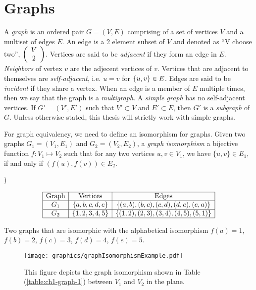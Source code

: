 \section{Graphs}
A \textit{graph} is an ordered pair $G = (V,E)$ comprising of a set of vertices $V$ and a multiset of edges $E$.  
An edge is a 2 element subset of $V$ and denoted as ``V choose two'', $\left(\begin{array}{c}V\\2\end{array}\right)$.
Vertices are said to be \textit{adjacent} if they form an edge in $E$.  
\textit{Neighbors} of vertex $v$ are the adjecent vertices of $v$.
Vertices that are adjacent to themselves are \textit{self-adjacent}, i.e. $u = v$ for $\left\lbrace u,v \right\rbrace \in E$.  
Edges are said to be \textit{incident} if they share a vertex.  
When an edge is a member of $E$ multiple times, then we say that the graph is a \textit{multigraph}.   
A \textit{simple graph} has no self-adjacent vertices. 
If $G' = (V',E')$ such that $V' \subset V$ and $E' \subset E$, then $G'$ is a \textit{subgraph} of $G$.
Unless otherwise stated, this thesis will 
strictly work with simple graphs.

For graph equivalency, we need to define an isomorphism for graphs.  Given 
two graphs $G_1 =(V_1,E_1)$ and $G_2 = (V_2,E_2) $, a \textit{graph isomorphism} a bijective 
function $f: V_1 \mapsto 
V_2$ 
such that for any two vertices $u,v \in V_1$, we have $\{u, v\} \in E_1$, if and 
only 
if $(f(u),f(v)) \in E_2$. 
\begin{table}[!ht]\label{table:ch1-graph-1})
\begin{center}
$$\begin{array}{|c|c|c|}\hline
\text{Graph}&\text{Vertices}&\text{Edges}\\\hline
G_1&\left\lbrace a,b,c,d,e \right\rbrace & \left\lbrace (a,b),(b,c),(c,d),(d,e),(e,a) \right\rbrace 
\\\hline
G_2&\left\lbrace 1,2,3,4,5 \right\rbrace & \left\lbrace (1,2),(2,3),(3,4),(4,5),(5,1) \right\rbrace 
\\\hline
\end{array} $$
\caption{Two graphs that are isomorphic with the alphabetical isomorphism $f(a)=1$, $f(b)=2$, $f(c) 
= 3$, $f(d)=4$, $f(e)=5$.}
\end{center} 
\label{table:ch1-graph-1}
\end{table}

\begin{figure}[!h]
\begin{center}
\texttt{[image: graphics/graphIsomorphismExample.pdf]}
\end{center} 
\caption{This figure depicts the graph isomorphism shown in Table 
(\ref{table:ch1-graph-1}) between 
$V_1$ and $V_2$ in the plane.}
\label{fig:configuration-3}
\end{figure}

